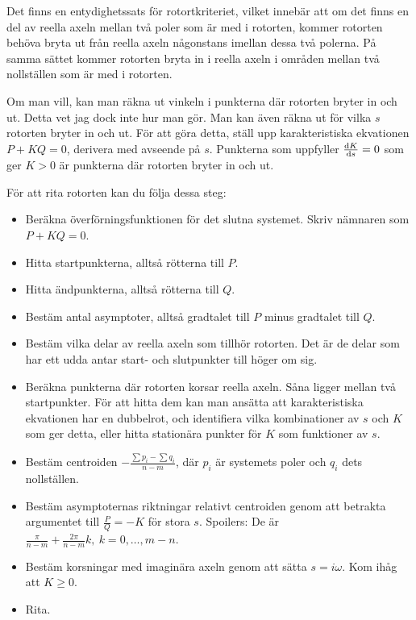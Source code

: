 Det finns en entydighetssats för rotortkriteriet, vilket innebär att om det finns en del av reella axeln mellan två poler som är med i rotorten, kommer rotorten behöva bryta ut från reella axeln någonstans imellan dessa två polerna. På samma sättet kommer rotorten bryta in i reella axeln i områden mellan två nollställen som är med i rotorten.

Om man vill, kan man räkna ut vinkeln i punkterna där rotorten bryter in och ut. Detta vet jag dock inte hur man gör. Man kan även räkna ut för vilka $s$ rotorten bryter in och ut. För att göra detta, ställ upp karakteristiska ekvationen $P + KQ = 0$, derivera med avseende på $s$. Punkterna som uppfyller $\dv{K}{s} = 0$ som ger $K > 0$ är punkterna där rotorten bryter in och ut.

För att rita rotorten kan du följa dessa steg:
\begin{itemize}
	\item Beräkna överförningsfunktionen för det slutna systemet. Skriv nämnaren som $P + KQ = 0$.
	\item Hitta startpunkterna, alltså rötterna till $P$.
	\item Hitta ändpunkterna, alltså rötterna till $Q$.
	\item Bestäm antal asymptoter, alltså gradtalet till $P$ minus gradtalet till $Q$.
	\item Bestäm vilka delar av reella axeln som tillhör rotorten. Det är de delar som har ett udda antar start- och slutpunkter till höger om sig.
	\item Beräkna punkterna där rotorten korsar reella axeln. Såna ligger mellan två startpunkter. För att hitta dem kan man ansätta att karakteristiska ekvationen har en dubbelrot, och identifiera vilka kombinationer av $s$ och $K$ som ger detta, eller hitta stationära punkter  för $K$ som funktioner av $s$.
	\item Bestäm centroiden $-\frac{\sum p_{i} - \sum q_{i}}{n - m}$, där $p_{i}$ är systemets poler och $q_{i}$ dets nollställen.
	\item Bestäm asymptoternas riktningar relativt centroiden genom att betrakta argumentet till $\frac{P}{Q} = -K$ för stora $s$. Spoilers: De är $\frac{\pi}{n - m} + \frac{2\pi}{n - m}k,\ k = 0, \dots, m - n$.
	\item Bestäm korsningar med imaginära axeln genom att sätta $s = i\omega$. Kom ihåg att $K\geq 0$.
	\item Rita.
\end{itemize}

